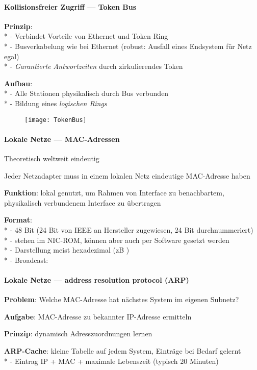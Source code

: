 \paragraph{Kollisionsfreier Zugriff --- Token Bus}
\begin{items}
  \item \textbf{Prinzip}: \\*
    - Verbindet Vorteile von Ethernet und Token Ring \\*
    - Busverkabelung wie bei Ethernet (robust: Ausfall eines Endsystem für Netz egal) \\*
    - \emph{Garantierte Antwortzeiten} durch zirkulierendes Token
  \item \textbf{Aufbau}: \\*
    - Alle Stationen physikalisch durch Bus verbunden \\*
    - Bildung eines \emph{logischen Rings}
\end{items}
\begin{figure}[H]\centering\label{TokenBus}\texttt{[image: TokenBus]}\end{figure}

\paragraph{Lokale Netze --- MAC-Adressen}
\begin{items}
  \item Theoretisch weltweit eindeutig
  \item Jeder Netzadapter muss in einem lokalen Netz eindeutige MAC-Adresse haben
  \item \textbf{Funktion}: lokal genutzt, um Rahmen von Interface zu benachbartem, physikalisch verbundenem Interface zu übertragen
  \item \textbf{Format}: \\*
    - 48 Bit (24 Bit von IEEE an Hersteller zugewiesen, 24 Bit durchnummeriert) \\*
    - stehen im NIC-ROM, können aber auch per Software gesetzt werden \\*
    - Darstellung meist hexadezimal (zB ) \\*
    - Broadcast: 
\end{items}

\paragraph{Lokale Netze --- address resolution protocol (ARP)}
\begin{items}
  \item \textbf{Problem}: Welche MAC-Adresse hat nächstes System im eigenen Subnetz?
  \item \textbf{Aufgabe}: MAC-Adresse zu bekannter IP-Adresse ermitteln
  \item \textbf{Prinzip}: dynamisch Adresszuordnungen lernen
  \item \textbf{ARP-Cache}: kleine Tabelle auf jedem System, Einträge bei Bedarf gelernt \\*
    - Eintrag IP + MAC + maximale Lebenszeit (typisch 20 Minuten) 
\end{items}

